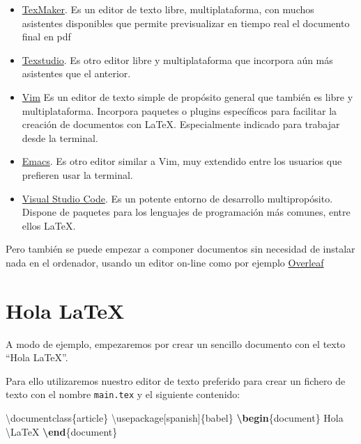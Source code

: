 \documentclass[
  a4paper,
]{scrreport}
\newenvironment{Shaded}{\begin{snugshade}}{\end{snugshade}}
\newcommand{\BuiltInTok}[1]{\textcolor[rgb]{0.00,0.23,0.31}{#1}}
\newcommand{\ExtensionTok}[1]{\textcolor[rgb]{0.00,0.23,0.31}{#1}}
\newcommand{\FunctionTok}[1]{\textcolor[rgb]{0.28,0.35,0.67}{#1}}
\newcommand{\KeywordTok}[1]{\textcolor[rgb]{0.00,0.23,0.31}{\textbf{#1}}}
\newcommand{\NormalTok}[1]{\textcolor[rgb]{0.00,0.23,0.31}{#1}}
\providecommand{\tightlist}{%
  \setlength{\itemsep}{0pt}\setlength{\parskip}{0pt}}\usepackage{longtable,booktabs,array}
\theoremstyle{definition}
\theoremstyle{remark}
\begin{document}
\begin{itemize}
\tightlist
\item
  \href{http://www.xm1math.net/texmaker/}{TexMaker}. Es un editor de
  texto libre, multiplataforma, con muchos asistentes disponibles que
  permite previsualizar en tiempo real el documento final en pdf
\item
  \href{http://www.texstudio.org/}{Texstudio}. Es otro editor libre y
  multiplataforma que incorpora aún más asistentes que el anterior.
\item
  \href{https://www.vim.org/}{Vim} Es un editor de texto simple de
  propósito general que también es libre y multiplataforma. Incorpora
  paquetes o plugins específicos para facilitar la creación de
  documentos con \LaTeX. Especialmente indicado para trabajar desde la
  terminal.
\item
  \href{https://www.gnu.org/software/emacs/}{Emacs}. Es otro editor
  similar a Vim, muy extendido entre los usuarios que prefieren usar la
  terminal.
\item
  \href{https://code.visualstudio.com/}{Visual Studio Code}. Es un
  potente entorno de desarrollo multipropósito. Dispone de paquetes para
  los lenguajes de programación más comunes, entre ellos \LaTeX.
\end{itemize}

Pero también se puede empezar a componer documentos sin necesidad de
instalar nada en el ordenador, usando un editor on-line como por ejemplo
\href{https://www.overleaf.com/}{Overleaf}

\section{Hola LaTeX}\label{hola-latex}

A modo de ejemplo, empezaremos por crear un sencillo documento con el
texto ``Hola \LaTeX''.

Para ello utilizaremos nuestro editor de texto preferido para crear un
fichero de texto con el nombre \texttt{main.tex} y el siguiente
contenido:

\begin{Shaded}
\begin{Highlighting}[]
\BuiltInTok{\textbackslash{}documentclass}\NormalTok{\{}\ExtensionTok{article}\NormalTok{\}}
\BuiltInTok{\textbackslash{}usepackage}\NormalTok{[spanish]\{}\ExtensionTok{babel}\NormalTok{\}}
\KeywordTok{\textbackslash{}begin}\NormalTok{\{}\ExtensionTok{document}\NormalTok{\}}
\NormalTok{Hola }\FunctionTok{\textbackslash{}LaTeX}
\KeywordTok{\textbackslash{}end}\NormalTok{\{}\ExtensionTok{document}\NormalTok{\}}
\end{Highlighting}
\end{Shaded}
\end{document}
